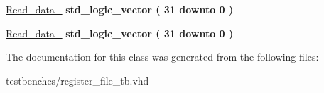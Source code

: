 \begin{DoxyCompactItemize}
\item 
\hypertarget{classregister__file__tb_1_1behavior_a52d099ba211189fcde4bdd91c2dc9e3c}{\hyperlink{classregister__file__tb_1_1behavior_a52d099ba211189fcde4bdd91c2dc9e3c}{\-Read\-\_\-data\-\_} {\bfseries std\-\_\-logic\-\_\-vector (   31    downto    0  ) } }\label{classregister__file__tb_1_1behavior_a52d099ba211189fcde4bdd91c2dc9e3c}

\item 
\hypertarget{classregister__file__tb_1_1behavior_ad80374a8a0d8eac296faebd14282884c}{\hyperlink{classregister__file__tb_1_1behavior_ad80374a8a0d8eac296faebd14282884c}{\-Read\-\_\-data\-\_} {\bfseries std\-\_\-logic\-\_\-vector (   31    downto    0  ) } }\label{classregister__file__tb_1_1behavior_ad80374a8a0d8eac296faebd14282884c}

\end{DoxyCompactItemize}


\-The documentation for this class was generated from the following files\-:\begin{DoxyCompactItemize}
\item 
testbenches/register\-\_\-file\-\_\-tb.\-vhd\end{DoxyCompactItemize}
